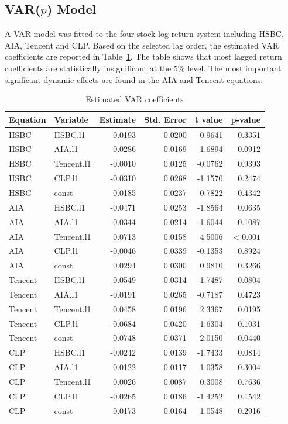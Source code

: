 \documentclass[11pt,a4paper]{article}
\begin{document}
\subsection{VAR($p$) Model}

A VAR model was fitted to the four-stock log-return system including HSBC,
AIA, Tencent and CLP. Based on the selected lag order, the estimated VAR
coefficients are reported in Table~\ref{tab:var_coef}. The table shows that
most lagged return coefficients are statistically insignificant at the 5\%
level. The most important significant dynamic effects are found in the AIA
and Tencent equations.

\begin{table}[H]
\centering
\caption{Estimated VAR coefficients}
\label{tab:var_coef}
{
\begin{tabular}{llrrrr}
\toprule
Equation & Variable & Estimate & Std. Error & t value & p-value \\
\midrule
HSBC & HSBC.l1    &  0.0193 & 0.0200 &  0.9641 & 0.3351 \\
HSBC & AIA.l1     &  0.0286 & 0.0169 &  1.6894 & 0.0912 \\
HSBC & Tencent.l1 & -0.0010 & 0.0125 & -0.0762 & 0.9393 \\
HSBC & CLP.l1     & -0.0310 & 0.0268 & -1.1570 & 0.2474 \\
HSBC & const      &  0.0185 & 0.0237 &  0.7822 & 0.4342 \\

AIA & HSBC.l1     & -0.0471 & 0.0253 & -1.8564 & 0.0635 \\
AIA & AIA.l1      & -0.0344 & 0.0214 & -1.6044 & 0.1087 \\
AIA & Tencent.l1  &  0.0713 & 0.0158 &  4.5006 & $<0.001$ \\
AIA & CLP.l1      & -0.0046 & 0.0339 & -0.1353 & 0.8924 \\
AIA & const       &  0.0294 & 0.0300 &  0.9810 & 0.3266 \\

Tencent & HSBC.l1    & -0.0549 & 0.0314 & -1.7487 & 0.0804 \\
Tencent & AIA.l1     & -0.0191 & 0.0265 & -0.7187 & 0.4723 \\
Tencent & Tencent.l1 &  0.0458 & 0.0196 &  2.3367 & 0.0195 \\
Tencent & CLP.l1     & -0.0684 & 0.0420 & -1.6304 & 0.1031 \\
Tencent & const      &  0.0748 & 0.0371 &  2.0150 & 0.0440 \\

CLP & HSBC.l1     & -0.0242 & 0.0139 & -1.7433 & 0.0814 \\
CLP & AIA.l1      &  0.0122 & 0.0117 &  1.0358 & 0.3004 \\
CLP & Tencent.l1  &  0.0026 & 0.0087 &  0.3008 & 0.7636 \\
CLP & CLP.l1      & -0.0265 & 0.0186 & -1.4252 & 0.1542 \\
CLP & const       &  0.0173 & 0.0164 &  1.0548 & 0.2916 \\
\bottomrule
\end{tabular}
}
\end{table}
\end{document}
